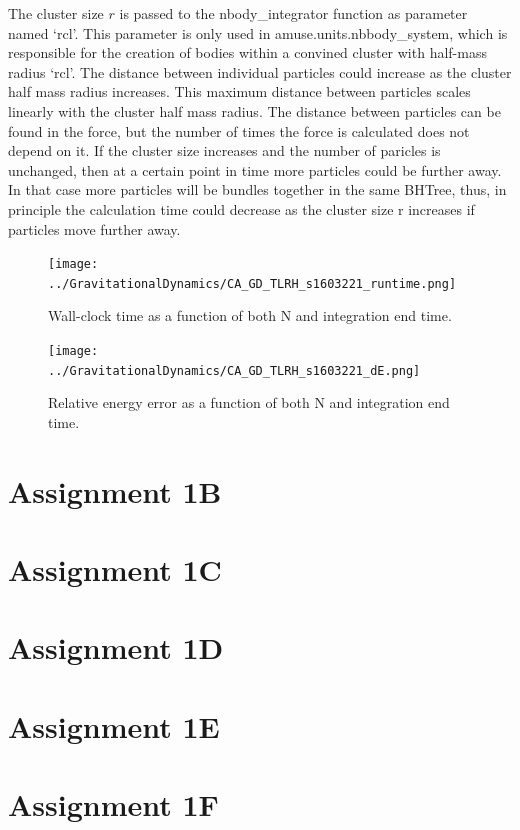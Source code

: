 \documentclass[a4paper]{article}
\begin{document}
The cluster size $r$ is passed to the nbody\_integrator function as parameter
named `rcl'. This parameter is only used in amuse.units.nbbody\_system, which is
responsible for the creation of bodies within a convined cluster with half-mass
radius `rcl'. The distance between individual particles could increase  as the
cluster half mass radius increases. This maximum distance between particles
scales linearly with the cluster half mass radius. The distance between
particles can be found in the force, but the number of times the force is
calculated does not depend on it. If the cluster size increases and the number
of paricles is unchanged, then at a certain point in time more particles could
be further away. In that case more particles will be bundles together in the
same BHTree, thus, in principle the calculation time could decrease as the
cluster size r increases if particles move further away. 
\begin{figure}[h!]
\begin{center}
\texttt{[image: ../GravitationalDynamics/CA\_GD\_TLRH\_s1603221\_runtime.png]}
\caption{Wall-clock time as a function of both N and integration end time.}
\label{fig:runtime}
\end{center}
\end{figure}

\newpage
\begin{figure}[h!]
\begin{center}
\texttt{[image: ../GravitationalDynamics/CA\_GD\_TLRH\_s1603221\_dE.png]}
\caption{Relative energy error as a function of both N and integration end time.}
\label{fig:dE}
\end{center}
\end{figure}

\section*{Assignment 1B}

\section*{Assignment 1C}

\section*{Assignment 1D}

\section*{Assignment 1E}

\section*{Assignment 1F}
\end{document}
